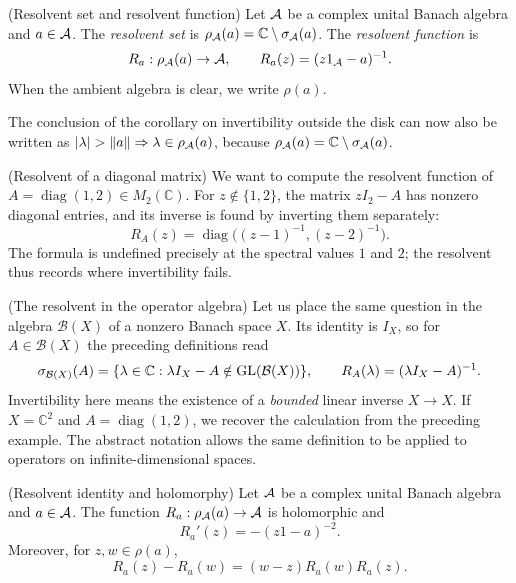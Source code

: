\begin{cthdefinicion}{(Resolvent set and resolvent function)}
Let $\mathcal A$ be a complex unital Banach algebra and $a\in\mathcal A$.
The \emph{resolvent set} is $\rho_\mathcal A(a)=\mathbb C\setminus\sigma_\mathcal A(a)$.
The \emph{resolvent function} is
\[
 R_a:\rho_\mathcal A(a)\to\mathcal A,\qquad R_a(z)=(z1_\mathcal A-a)^{-1}.
\]
When the ambient algebra is clear, we write $\rho(a)$.
\end{cthdefinicion}

\noindent The conclusion of the corollary on invertibility outside the disk
can now also be written as
$|\lambda|>\|a\|\Rightarrow\lambda\in\rho_\A(a)$, because
$\rho_\mathcal A(a)=\mathbb C\setminus\sigma_\mathcal A(a)$.

\begin{cthejemplo}{(Resolvent of a diagonal matrix)}
We want to compute the resolvent function of
$A=\operatorname{diag}(1,2)\in M_2(\mathbb C)$.
For $z\notin\{1,2\}$, the matrix $zI_2-A$ has nonzero diagonal entries,
and its inverse is found by inverting them separately:
\[
 R_A(z)=\operatorname{diag}\bigl((z-1)^{-1},(z-2)^{-1}\bigr).
\]
The formula is undefined precisely at the spectral values
$1$ and $2$; the resolvent thus records where invertibility fails.
\end{cthejemplo}

\begin{cthejemplo}{(The resolvent in the operator algebra)}
Let us place the same question in the algebra $\mathcal B(X)$ of a nonzero
Banach space $X$. Its identity is $I_X$, so for
$A\in\mathcal B(X)$ the preceding definitions read
\[
 \sigma_{\mathcal B(X)}(A)
 =\{\lambda\in\mathbb C:\lambda I_X-A\notin\operatorname{GL}(\mathcal B(X))\},
 \qquad R_A(\lambda)=(\lambda I_X-A)^{-1}.
\]
Invertibility here means the existence of a \emph{bounded} linear inverse
$X\to X$. If $X=\mathbb C^2$ and
$A=\operatorname{diag}(1,2)$, we recover the calculation from the
preceding example. The abstract notation allows the same definition
to be applied to operators on infinite-dimensional spaces.
\end{cthejemplo}

\begin{cthlema}{(Resolvent identity and holomorphy)}
Let $\mathcal A$ be a complex unital Banach algebra and $a\in\mathcal A$.
The function $R_a:\rho_\mathcal A(a)\to\mathcal A$ is holomorphic and
\[
 R_a'(z)=-(z1-a)^{-2}.
\]
Moreover, for $z,w\in\rho(a)$,
\[
 R_a(z)-R_a(w)=(w-z)R_a(w)R_a(z).
\]
\end{cthlema}

